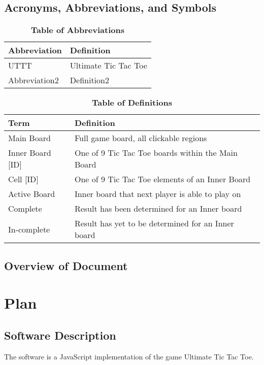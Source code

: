 \documentclass[12pt, titlepage]{article}
\begin{document}
\subsection{Acronyms, Abbreviations, and Symbols}
	
\begin{table}[hbp]
\caption{\textbf{Table of Abbreviations}} \label{Table}

\begin{tabularx}{\textwidth}{p{3cm}X}
\toprule
\textbf{Abbreviation} & \textbf{Definition} \\
\midrule
UTTT & Ultimate Tic Tac Toe\\
Abbreviation2 & Definition2\\
\bottomrule
\end{tabularx}

\end{table}

\begin{table}[!htbp]
\caption{\textbf{Table of Definitions}} \label{Table}

\begin{tabularx}{\textwidth}{p{3cm}X}
\toprule
\textbf{Term} & \textbf{Definition}\\
\midrule
Main Board & Full game board, all clickable regions \\
Inner Board [ID] & One of 9 Tic Tac Toe boards within the Main Board\\
Cell [ID] & One of 9 Tic Tac Toe elements of an Inner Board\\
Active Board & Inner board that next player is able to play on\\
Complete & Result has been determined for an Inner board \\
In-complete & Result has yet to be determined for an Inner board \\
\bottomrule
\end{tabularx}

\end{table}	

\subsection{Overview of Document}

\section{Plan}
	
\subsection{Software Description}
The software is a JavaScript implementation of the game Ultimate Tic Tac Toe. 
\end{document}
